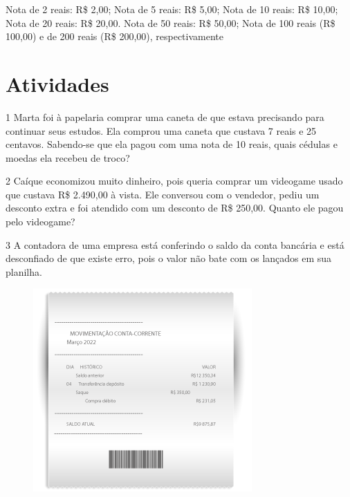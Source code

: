 {Nota de 2 reais: R\$ 2,00; Nota de 5 reais: R\$ 5,00; Nota de 10 reais: R\$ 10,00; Nota de 20 reais: R\$ 20,00. Nota de 50 reais: R\$ 50,00; Nota de 100 reais (R\$ 100,00) e de 200 reais (R\$ 200,00), respectivamente
}

\pagebreak

\section*{Atividades}

\num{1} Marta foi à papelaria comprar uma caneta de que estava precisando para continuar seus estudos. Ela comprou uma caneta que custava 7 reais e 25
centavos. Sabendo-se que ela pagou com uma nota de 10 reais, quais
cédulas e moedas ela recebeu de troco?



\num{2} Caíque economizou muito dinheiro, pois queria comprar um videogame
usado que custava R\$ 2.490,00 à vista. Ele conversou com o vendedor, pediu um desconto extra e foi atendido com um desconto de R\$ 250,00.
Quanto ele pagou pelo videogame?

\bigskip
\bigskip
\bigskip


\num{3} A contadora de uma empresa está conferindo o saldo da conta
bancária e está desconfiado de que existe erro, pois o valor não bate com
os lançados em sua planilha.

\begin{figure}[htpb!]
\centering
\includegraphics[width=.5\textwidth]{../ilustracoes/MAT5/SAEB_5ANO_MAT_figura49.png}
\end{figure}

